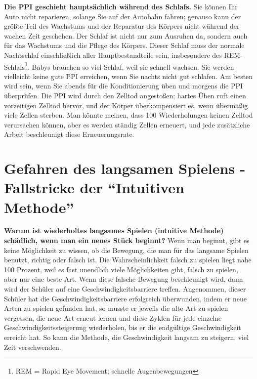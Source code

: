 \textbf{Die PPI geschieht hauptsächlich während des Schlafs.}
Sie können Ihr Auto nicht reparieren, solange Sie auf der Autobahn fahren; genauso kann der größte Teil des Wachstums und der Reparatur des Körpers nicht während der wachen Zeit geschehen.
Der Schlaf ist nicht nur zum Ausruhen da, sondern auch für das Wachstums und die Pflege des Körpers.
Dieser Schlaf muss der normale Nachtschlaf einschließlich aller Hauptbestandteile sein, insbesondere des REM-Schlafs\footnote{REM = Rapid Eye Movement; schnelle Augenbewegungen}.
Babys brauchen so viel Schlaf, weil sie schnell wachsen.
Sie werden vielleicht keine gute PPI erreichen, wenn Sie nachts nicht gut schlafen.
Am besten wird sein, wenn Sie abends für die Konditionierung üben und morgens die PPI überprüfen.
Die PPI wird durch den Zelltod angestoßen; hartes Üben ruft einen vorzeitigen Zelltod hervor, und der Körper überkompensiert es, wenn übermäßig viele Zellen sterben.
Man könnte meinen, dass 100 Wiederholungen keinen Zelltod verursachen können, aber es werden ständig Zellen  erneuert, und jede zusätzliche Arbeit beschleunigt diese Erneuerungsrate.


\section{Gefahren des langsamen Spielens - Fallstricke der \enquote{Intuitiven Methode}}
\label{c1ii16}

\textbf{Warum ist wiederholtes langsames Spielen (intuitive Methode) schädlich, wenn man ein neues Stück beginnt?}
Wenn man beginnt, gibt es keine Möglichkeit zu wissen, ob die Bewegung, die man für das langsame Spielen benutzt, richtig oder falsch ist.
Die Wahrscheinlichkeit falsch zu spielen liegt nahe 100 Prozent, weil es fast unendlich viele Möglichkeiten gibt, falsch zu spielen, aber nur eine beste Art.
Wenn diese falsche Bewegung beschleunigt wird, dann wird der Schüler auf eine Geschwindigkeitsbarriere treffen.
Angenommen, dieser Schüler hat die Geschwindigkeitsbarriere erfolgreich überwunden, indem er neue Arten zu spielen gefunden hat, so musste er jeweils die alte Art zu spielen vergessen, die neue Art erneut lernen und diese Zyklen für jede einzelne Geschwindigkeitssteigerung wiederholen, bis er die endgültige Geschwindigkeit erreicht hat.
So kann die Methode, die Geschwindigkeit langsam zu steigern, viel Zeit verschwenden.

